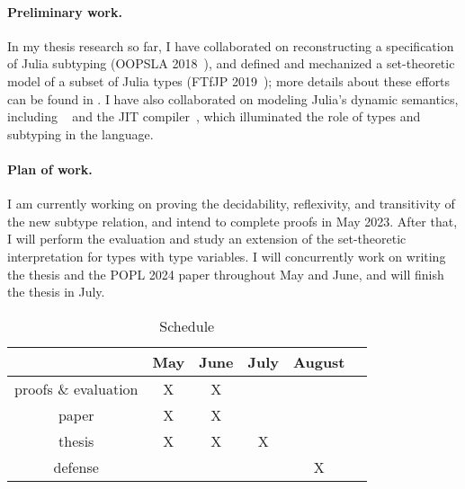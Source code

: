 \paragraph*{Preliminary work.}
In my thesis research so far,
I have collaborated on reconstructing a specification of Julia subtyping
(OOPSLA 2018~\cite{TODO}),
and defined and mechanized a set-theoretic model of a subset of Julia types
(FTfJP 2019~\cite{TODO});
more details about these efforts can be found in .
I have also collaborated on modeling Julia's dynamic semantics, including
~\cite{TODO}
and the JIT compiler~\cite{TODO},
which illuminated the role of types and subtyping
in the language.

\paragraph*{Plan of work.}
I am currently working on proving the decidability, reflexivity,
and transitivity of the new subtype relation,
and intend to complete proofs in May 2023.
After that, I will perform the evaluation
and study an extension of the set-theoretic interpretation
for types with type variables.
I will concurrently work on writing the thesis and the POPL 2024 paper
throughout May and June, and will finish the thesis in July.

\begin{table}[h]
  \caption{Schedule}
  \vspace*{0.25em}
  \centering\footnotesize
  \begin{tabular}{c|ccccc}
  \toprule
  & May & June & July & August \\
  \midrule
  proofs \& evaluation & X & X & & \\
  paper & X & X & & \\
  thesis & X & X & X & \\
  defense & & & & X \\
\end{tabular}
\end{table}

